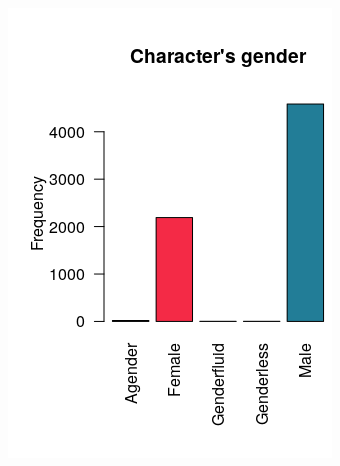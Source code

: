 \begin{figure}[!htb]
    \centering
    \begin{minipage}{.43\textwidth}
        \centering
        \includegraphics[width=\linewidth]{img/genders_plot.png}
    \end{minipage}%
     \begin{minipage}{.10\textwidth}
      \hfill
    \end{minipage}%
    \begin{minipage}{0.47\textwidth}
      \centering

\end{minipage}
\end{figure}

